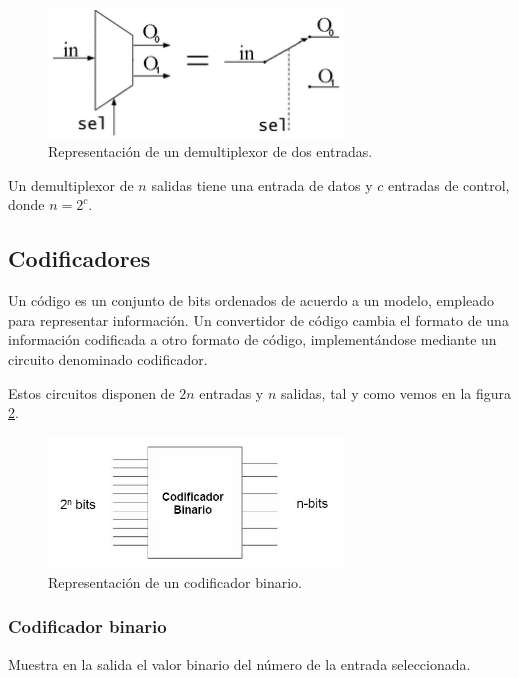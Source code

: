 \documentclass[a4paper, 11pt, titlepage]{article}
\begin{document}
		\begin{figure}[htp]
			\centering
			\includegraphics[width=0.7\textwidth]{resources/demultiplexor.png}
			\caption{Representación de un demultiplexor de dos entradas.}
			\label{demultiplexor}
		\end{figure}

		Un demultiplexor de $n$ salidas tiene una entrada de datos y $c$ entradas de control, donde $n=2^c$.

	\subsection{Codificadores}

		Un código es un conjunto de bits ordenados de acuerdo a un modelo, empleado para representar información.
		Un convertidor de código cambia el formato de una información codificada a otro formato de código, implementándose 
		mediante un circuito denominado codificador.

		Estos circuitos disponen de $2n$ entradas y $n$ salidas, tal y como vemos en la figura \ref{codificador}.

		\begin{figure}[htp]
			\centering
			\includegraphics[width=0.7\textwidth]{resources/codificador.jpg}
			\caption{Representación de un codificador binario.}
			\label{codificador}
		\end{figure}

		\subsubsection{Codificador binario}

			Muestra en la salida el valor binario del número de la entrada seleccionada.
\end{document}
